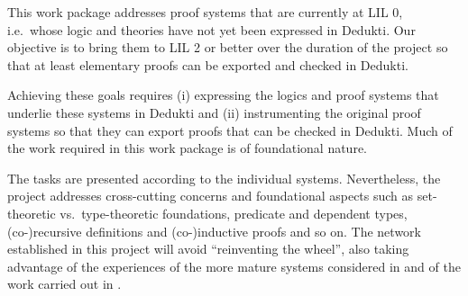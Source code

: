 \begin{workpackage}[id=theories,type=RTD,wphases=1-48,
  short=Theories,%
  title= Theories,
  lead=Inn,
  BiaRM=70,
  BirRM=3,
  IasRM=5,
  InnRM=12,
  InrRM=83,
  LeeRM=3,
  LmuRM=16,
  MedRM=4,
  ProRM=11,
  RunRM=7,
  wphases=1-48,
  ]

\begin{wpobjectives}
  This work package addresses proof systems that are currently at LIL 0, i.e.\
  whose logic and theories have not yet been expressed in Dedukti. Our
  objective is to bring them to LIL 2 or better over the duration of the
  project so that at least elementary proofs can be exported and checked in
  Dedukti.

  Achieving these goals requires (i) expressing the logics and proof systems
  that underlie these systems in Dedukti and
  (ii) instrumenting the original proof systems so that they can export proofs
  that can be checked in Dedukti. Much of the work required in this work package
  is of foundational nature.
\end{wpobjectives}
\begin{wpdescription}
  The tasks are presented according to the individual systems. Nevertheless,
  the project addresses cross-cutting concerns and foundational aspects such
  as set-theoretic vs.\ type-theoretic foundations, predicate and dependent
  types, (co-)recursive definitions and (co-)inductive proofs and so on. The
  network established in this project will avoid ``reinventing the wheel'', also
  taking advantage of the experiences of the more mature systems considered in
  \WPref{instrumentation} and of the work carried out in \WPref{atpetc}.
\end{wpdescription}

\begin{tasklist}
%   


\end{tasklist}
\end{workpackage}
